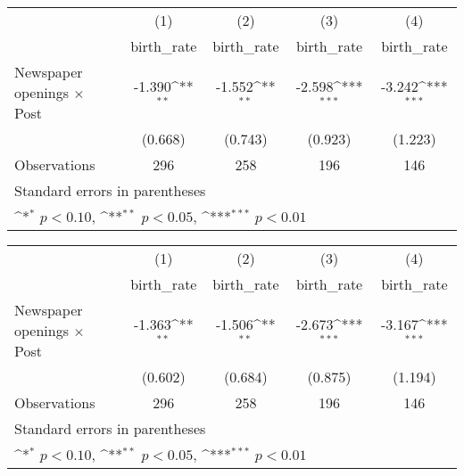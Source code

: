 {
\def\sym#1{\ifmmode^{#1}\else\(^{#1}\)\fi}
\begin{tabular}{l*{4}{c}}
\hline\hline
                    &\multicolumn{1}{c}{(1)}&\multicolumn{1}{c}{(2)}&\multicolumn{1}{c}{(3)}&\multicolumn{1}{c}{(4)}\\
                    &\multicolumn{1}{c}{birth\_rate}&\multicolumn{1}{c}{birth\_rate}&\multicolumn{1}{c}{birth\_rate}&\multicolumn{1}{c}{birth\_rate}\\
\hline
Newspaper openings $\times$ Post&      -1.390\sym{**} &      -1.552\sym{**} &      -2.598\sym{***}&      -3.242\sym{***}\\
                    &     (0.668)         &     (0.743)         &     (0.923)         &     (1.223)         \\
\hline
Observations        &         296         &         258         &         196         &         146         \\
\hline\hline
\multicolumn{5}{l}{\footnotesize Standard errors in parentheses}\\
\multicolumn{5}{l}{\footnotesize \sym{*} \(p<0.10\), \sym{**} \(p<0.05\), \sym{***} \(p<0.01\)}\\
\end{tabular}
}
{
\def\sym#1{\ifmmode^{#1}\else\(^{#1}\)\fi}
\begin{tabular}{l*{4}{c}}
\hline\hline
                    &\multicolumn{1}{c}{(1)}&\multicolumn{1}{c}{(2)}&\multicolumn{1}{c}{(3)}&\multicolumn{1}{c}{(4)}\\
                    &\multicolumn{1}{c}{birth\_rate}&\multicolumn{1}{c}{birth\_rate}&\multicolumn{1}{c}{birth\_rate}&\multicolumn{1}{c}{birth\_rate}\\
\hline
Newspaper openings $\times$ Post&      -1.363\sym{**} &      -1.506\sym{**} &      -2.673\sym{***}&      -3.167\sym{***}\\
                    &     (0.602)         &     (0.684)         &     (0.875)         &     (1.194)         \\
\hline
Observations        &         296         &         258         &         196         &         146         \\
\hline\hline
\multicolumn{5}{l}{\footnotesize Standard errors in parentheses}\\
\multicolumn{5}{l}{\footnotesize \sym{*} \(p<0.10\), \sym{**} \(p<0.05\), \sym{***} \(p<0.01\)}\\
\end{tabular}
}
